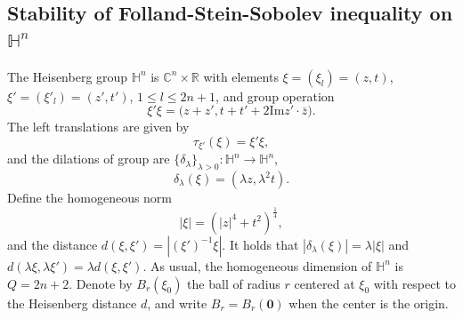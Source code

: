 \documentclass[11pt]{article}
\begin{document}
\subsection{Stability of Folland-Stein-Sobolev inequality on $\mathbb{H}^{n}$}
The Heisenberg group $\mathbb{H}^{n}$ is $\mathbb{C}^{n}\times\mathbb{R}$ with elements $\xi=(\xi_{l})=(z,t)$, $\xi'=(\xi'_{l})=(z',t')$, $1\leq l\leq 2n+1$, and group operation
\begin{equation*}
	\xi'\xi=\big(z+z',t+t'+2\mathrm{Im}z'\cdot\bar{z}\big).
\end{equation*}
The left translations are given by
\begin{equation*}
\tau_{\xi'}(\xi)=\xi'\xi,
\end{equation*}
and the dilations of group are
$\{\delta_{\lambda}\}_{\lambda>0}: \mathbb{H}^{n}\rightarrow\mathbb{H}^{n}$,
\begin{equation*}
\delta_{\lambda}(\xi)=(\lambda z,\lambda^{2}t).
\end{equation*}
Define the homogeneous norm
\begin{equation*}
|\xi|=(|z|^{4}+t^{2})^{\frac{1}{4}},
\end{equation*}
 and the distance
$d(\xi,\xi')=|(\xi')^{-1}\xi|$.
It holds that $|\delta_{\lambda}(\xi)|=\lambda|\xi|$ and
$d(\lambda\xi,\lambda\xi')=\lambda d(\xi,\xi')$.
As usual, the homogeneous dimension of $\mathbb{H}^{n}$ is $Q=2n+2$. Denote by $B_r(\xi_0)$ the ball of radius $r$ centered at $\xi_0$ with respect to the Heisenberg distance $d$, and write $B_r=B_r(\mathbf{0})$ when the center is the origin.
\end{document}
